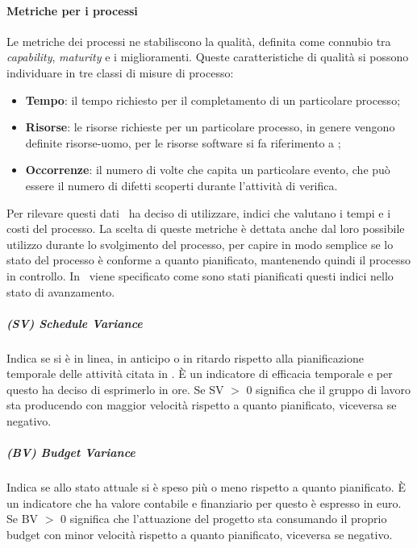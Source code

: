\paragraph{Metriche per i processi}
Le metriche dei processi ne stabiliscono la qualità, definita come connubio tra \textit{capability}, \textit{maturity} e i miglioramenti. Queste caratteristiche di qualità si possono individuare in tre classi di misure di processo:
\begin{itemize}
\item \textbf{Tempo}: il tempo richiesto per il completamento di un particolare processo;
\item \textbf{Risorse}: le risorse richieste per un particolare processo, in genere vengono definite risorse-uomo, per le risorse software si fa riferimento a \infoNDP;
\item \textbf{Occorrenze}: il numero di volte che capita un particolare evento, che può essere il numero di difetti scoperti durante l'attività di verifica.
\end{itemize}
Per rilevare questi dati \gruppo ~ha deciso di utilizzare, indici che valutano i tempi e i costi del processo. La scelta di queste metriche è dettata anche dal loro possibile utilizzo durante lo svolgimento del processo, per capire in modo semplice se lo stato del processo è conforme a quanto pianificato, mantenendo quindi il processo in controllo. In \infoPDP ~viene specificato come sono stati pianificati questi indici nello stato di avanzamento.
\subparagraph{(SV) Schedule Variance}
Indica se si è in linea, in anticipo o in ritardo rispetto alla pianificazione temporale delle attività citata in \infoPDP.
È un indicatore di efficacia temporale e per questo \gruppo ha deciso di esprimerlo in ore.
Se SV $>$ 0 significa che il gruppo di lavoro sta producendo con maggior velocità rispetto a quanto pianificato, viceversa se negativo.\\

\subparagraph{(BV) Budget Variance}
Indica se allo stato attuale si è speso più o meno rispetto a quanto pianificato.
È un indicatore che ha valore contabile e finanziario per questo è espresso in euro.
Se BV $>$ 0 significa che l’attuazione del progetto sta consumando il proprio budget con minor velocità rispetto a quanto pianificato, viceversa se negativo.

